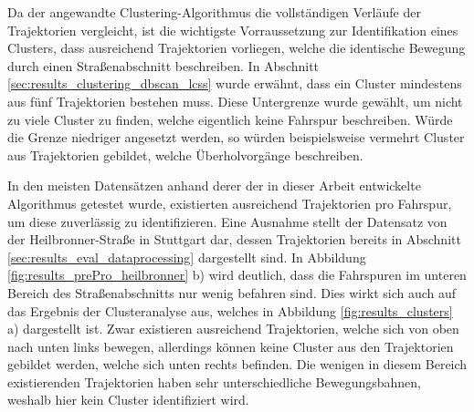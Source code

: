 Da der angewandte Clustering-Algorithmus die vollständigen Verläufe der
Trajektorien vergleicht, ist die wichtigste Vorraussetzung zur Identifikation eines Clusters, dass ausreichend
Trajektorien vorliegen, welche die identische Bewegung durch einen Straßenabschnitt beschreiben.
In Abschnitt \ref{sec:results_clustering_dbscan_lcss} wurde erwähnt, dass ein Cluster mindestens aus
fünf Trajektorien bestehen muss. Diese Untergrenze wurde gewählt, um nicht zu viele Cluster zu finden, welche
eigentlich keine Fahrspur beschreiben. Würde die Grenze niedriger angesetzt werden, so würden beispielsweise
vermehrt Cluster aus Trajektorien gebildet, welche Überholvorgänge beschreiben.

In den meisten Datensätzen anhand derer der in dieser Arbeit entwickelte Algorithmus getestet wurde,
existierten ausreichend Trajektorien pro Fahrspur, um diese zuverlässig zu identifizieren. Eine Ausnahme
stellt der Datensatz von der Heilbronner-Straße in Stuttgart dar, dessen Trajektorien bereits
in Abschnitt \ref{sec:results_eval_dataprocessing} dargestellt sind. In Abbildung \ref{fig:results_prePro_heilbronner} b)
wird deutlich, dass die Fahrspuren im
unteren Bereich des Straßenabschnitts nur wenig befahren sind. Dies wirkt sich auch auf das Ergebnis
der Clusteranalyse aus, welches in Abbildung \ref{fig:results_clusters} a) dargestellt ist.
Zwar existieren ausreichend Trajektorien, welche sich von oben nach unten links bewegen, allerdings können
keine Cluster aus den Trajektorien gebildet werden, welche sich unten rechts befinden.
Die wenigen in diesem Bereich existierenden Trajektorien haben sehr unterschiedliche Bewegungsbahnen,
weshalb hier kein Cluster identifiziert wird.

